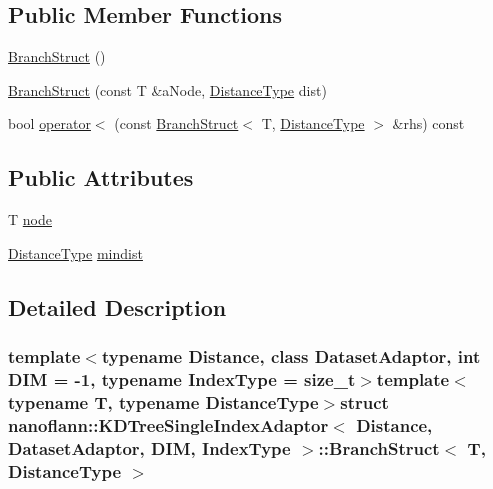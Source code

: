 \subsection*{Public Member Functions}
\begin{DoxyCompactItemize}
\item 
\hyperlink{structnanoflann_1_1_k_d_tree_single_index_adaptor_1_1_branch_struct_aba3ba55815d287de14df42bf37098ea8}{Branch\-Struct} ()
\item 
\hyperlink{structnanoflann_1_1_k_d_tree_single_index_adaptor_1_1_branch_struct_aac7996f8b84dabea451fce1460ca65fa}{Branch\-Struct} (const T \&a\-Node, \hyperlink{classnanoflann_1_1_k_d_tree_single_index_adaptor_addc764e7c19cc85c89b3903338e5a910}{Distance\-Type} dist)
\item 
bool \hyperlink{structnanoflann_1_1_k_d_tree_single_index_adaptor_1_1_branch_struct_a884cd16e926687b28daf3ce6ad520665}{operator$<$} (const \hyperlink{structnanoflann_1_1_k_d_tree_single_index_adaptor_1_1_branch_struct}{Branch\-Struct}$<$ T, \hyperlink{classnanoflann_1_1_k_d_tree_single_index_adaptor_addc764e7c19cc85c89b3903338e5a910}{Distance\-Type} $>$ \&rhs) const 
\end{DoxyCompactItemize}
\subsection*{Public Attributes}
\begin{DoxyCompactItemize}
\item 
T \hyperlink{structnanoflann_1_1_k_d_tree_single_index_adaptor_1_1_branch_struct_a86bcc74bb89be6b93db206feb8a3aad7}{node}
\item 
\hyperlink{classnanoflann_1_1_k_d_tree_single_index_adaptor_addc764e7c19cc85c89b3903338e5a910}{Distance\-Type} \hyperlink{structnanoflann_1_1_k_d_tree_single_index_adaptor_1_1_branch_struct_aa62cca16bd04ba7fd2ef25b3d3e8a6fa}{mindist}
\end{DoxyCompactItemize}


\subsection{Detailed Description}
\subsubsection*{template$<$typename Distance, class Dataset\-Adaptor, int D\-I\-M = -\/1, typename Index\-Type = size\-\_\-t$>$template$<$typename T, typename Distance\-Type$>$struct nanoflann\-::\-K\-D\-Tree\-Single\-Index\-Adaptor$<$ Distance, Dataset\-Adaptor, D\-I\-M, Index\-Type $>$\-::\-Branch\-Struct$<$ T, Distance\-Type $>$}

